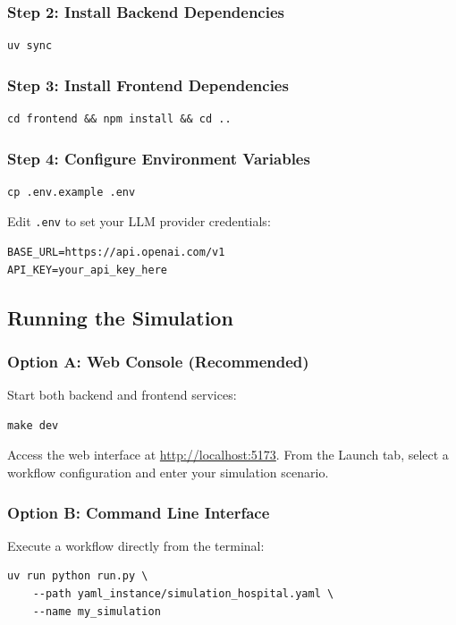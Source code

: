 \subsubsection{Step 2: Install Backend Dependencies}
\begin{verbatim}
uv sync
\end{verbatim}

\subsubsection{Step 3: Install Frontend Dependencies}
\begin{verbatim}
cd frontend && npm install && cd ..
\end{verbatim}

\subsubsection{Step 4: Configure Environment Variables}
\begin{verbatim}
cp .env.example .env
\end{verbatim}

Edit \texttt{.env} to set your LLM provider credentials:
\begin{verbatim}
BASE_URL=https://api.openai.com/v1
API_KEY=your_api_key_here
\end{verbatim}

\subsection{Running the Simulation}

\subsubsection{Option A: Web Console (Recommended)}

Start both backend and frontend services:
\begin{verbatim}
make dev
\end{verbatim}

Access the web interface at \url{http://localhost:5173}. From the Launch tab, select a workflow configuration and enter your simulation scenario.

\subsubsection{Option B: Command Line Interface}

Execute a workflow directly from the terminal:
\begin{verbatim}
uv run python run.py \
    --path yaml_instance/simulation_hospital.yaml \
    --name my_simulation
\end{verbatim}

